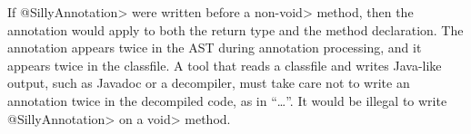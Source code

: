 \documentclass[10pt]{article}
\newcommand{\ttlcb}{\texttt{\char "7B}}
\newcommand{\ttrcb}{\texttt{\char "7D}}
\begin{document}
\noindent
If \<@SillyAnnotation> were written before a non-\<void> method, then
the annotation would apply to both the return type and the
method declaration.  The annotation appears twice in the AST
during annotation processing, and it appears twice in the classfile.
A tool that reads a classfile and writes Java-like output, such as Javadoc
or a decompiler, must take care not to write an annotation twice in the
decompiled code, as in ``\ldots''.
It would be illegal to write \<@SillyAnnotation> on a \<void> method.
\end{document}
